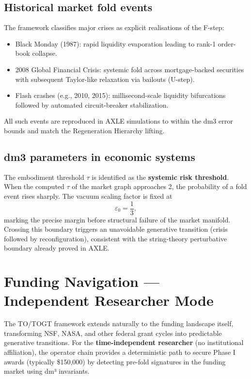 \documentclass[19pt]{book}
\theoremstyle{plain}
\theoremstyle{definition}
\theoremstyle{remark}
\begin{document}
\section{Historical market fold events}

The framework classifies major crises as explicit realisations of the F-step:

\begin{itemize}
\item Black Monday (1987): rapid liquidity evaporation leading to rank-1 order-book collapse.
\item 2008 Global Financial Crisis: systemic fold across mortgage-backed securities with subsequent Taylor-like relaxation via bailouts (U-step).
\item Flash crashes (e.g., 2010, 2015): millisecond-scale liquidity bifurcations followed by automated circuit-breaker stabilization.
\end{itemize}

All such events are reproduced in AXLE simulations to within the dm3 error bounds and match the Regeneration Hierarchy lifting.

\section{dm3 parameters in economic systems}

The embodiment threshold \(\tau\) is identified as the \textbf{systemic risk threshold}. When the computed \(\tau\) of the market graph approaches 2, the probability of a fold event rises sharply. The vacuum scaling factor is fixed at
\[
\varepsilon_0 = \frac{1}{3},
\]
marking the precise margin before structural failure of the market manifold. Crossing this boundary triggers an unavoidable generative transition (crisis followed by reconfiguration), consistent with the string-theory perturbative boundary already proved in AXLE.

\chapter{Funding Navigation — Independent Researcher Mode}

The TO/TOGT framework extends naturally to the funding landscape itself, transforming NSF, NASA, and other federal grant cycles into predictable generative transitions. For the \textbf{time-independent researcher} (no institutional affiliation), the operator chain provides a deterministic path to secure Phase I awards (typically \$150,000) by detecting pre-fold signatures in the funding market using dm³ invariants.
\end{document}
